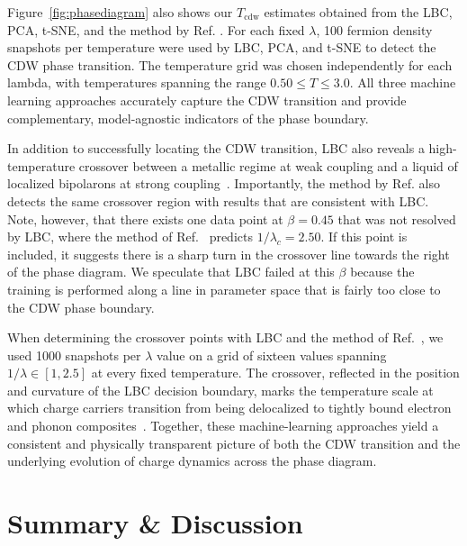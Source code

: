 \documentclass[%
reprint,
superscriptaddress,
nofootinbib,
twocolumn,
amsmath,amssymb,
aps,
prb,
]{revtex4-2}
\begin{document}
Figure~\ref{fig:phasediagram} also shows our $T_\mathrm{cdw}$ estimates obtained from the \gls*{LBC}, \gls*{PCA}, \gls*{t-SNE}, and the method by Ref. \cite{broecker2017quantum}. For each fixed $\lambda$, 100 fermion density snapshots per temperature were used by \gls*{LBC}, \gls*{PCA}, and \gls*{t-SNE} to detect the \gls*{CDW} phase transition. The temperature grid was chosen independently for each lambda, with temperatures spanning the range $0.50 \le T \le 3.0$. All three machine learning approaches accurately capture the \gls*{CDW} transition and provide complementary, model-agnostic indicators of the phase boundary.

In addition to successfully locating the \gls*{CDW} transition, \gls*{LBC} also reveals a high-temperature crossover between a metallic regime at weak coupling and a liquid of localized bipolarons at strong coupling~\cite{issa2025learning}. Importantly, the method by Ref. \cite{broecker2017quantum} also detects the same crossover region with results that are consistent with \gls*{LBC}. Note, however, that there exists one data point at $\beta=0.45$ that was not resolved by \gls*{LBC}, where the method of Ref.~\cite{broecker2017quantum} predicts $1/\lambda_c=2.50$. If this point is included, it suggests there is a sharp turn in the crossover line towards the right of the phase diagram. We speculate that \gls*{LBC} failed at this $\beta$ because the training is performed along a line in parameter space that is fairly too close to the \gls*{CDW} phase boundary. 

When determining the crossover points with \gls*{LBC} and the method of Ref.~\cite{issa2025learning}, we used 1000 snapshots per $\lambda$ value on a grid of sixteen values spanning $1/\lambda \in [1, 2.5]$ at every fixed temperature. The crossover, reflected in the position and curvature of the \gls*{LBC} decision boundary, marks the temperature scale at which charge carriers transition from being delocalized to tightly bound electron and phonon composites~\cite{issa2025learning}. Together, these machine-learning approaches yield a consistent and physically transparent picture of both the \gls*{CDW} transition and the underlying evolution of charge dynamics across the phase diagram.

\section{Summary \& Discussion}\label{sec:conclusions}
\end{document}
